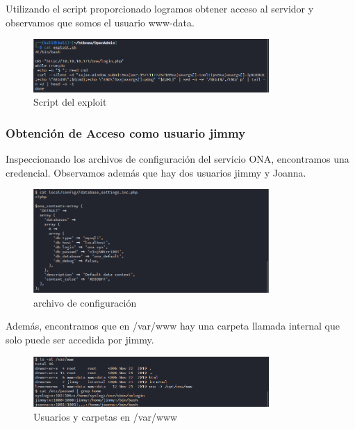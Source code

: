 \documentclass{article}
\begin{document}
Utilizando el script proporcionado logramos obtener acceso al servidor y observamos que somos el usuario www-data.
\begin{figure}[H]
	\center
	\includegraphics[width=0.8\textwidth]{images/openadmin/7-script.png}
	\caption{Script del exploit}
\end{figure}

\subsubsection{Obtención de Acceso como usuario jimmy}

Inspeccionando los archivos de configuración del servicio ONA, encontramos una credencial. Observamos además que hay dos usuarios jimmy y Joanna.
\begin{figure}[H]
	\center
	\includegraphics[width=0.8\textwidth]{images/openadmin/8-credencialesjimmy.png}
	\caption{archivo de configuración}
\end{figure}

Además, encontramos que en /var/www hay una carpeta llamada internal que solo puede ser accedida por jimmy.
\begin{figure}[H]
	\center
	\includegraphics[width=0.8\textwidth]{images/openadmin/9-usuariosycarpetas.png}
	\caption{Usuarios y carpetas en /var/www}
\end{figure}
\end{document}
